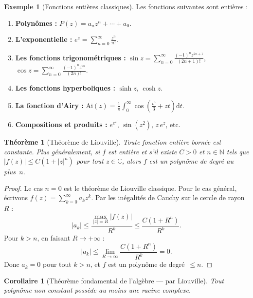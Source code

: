 \documentclass[12pt,a4paper,openany]{book}
\theoremstyle{definition}
\newtheorem{exemple}[definition]{Exemple}
\theoremstyle{plain}
\newtheorem{theoreme}[definition]{Théorème}
\newtheorem{corollaire}[definition]{Corollaire}
\theoremstyle{remark}
\newcommand{\C}{\mathbb{C}}
\newcommand{\N}{\mathbb{N}}
\newcommand{\dd}{\mathrm{d}}
\newcommand{\abs}[1]{\left|#1\right|}
\begin{document}
\begin{exemple}[Fonctions entières classiques]\label{ex:entieres-classiques}
Les fonctions suivantes sont entières :
\begin{enumerate}[label=(\roman*)]
  \item \textbf{Polynômes :} $P(z) = a_n z^n + \cdots + a_0$.
  \item \textbf{L'exponentielle :} $e^z = \sum_{n=0}^{\infty} \frac{z^n}{n!}$.
  \item \textbf{Les fonctions trigonométriques :}
    $\sin z = \sum_{n=0}^{\infty} \frac{(-1)^n z^{2n+1}}{(2n+1)!}$, \;
    $\cos z = \sum_{n=0}^{\infty} \frac{(-1)^n z^{2n}}{(2n)!}$.
  \item \textbf{Les fonctions hyperboliques :} $\sinh z$, $\cosh z$.
  \item \textbf{La fonction d'Airy :}
    $\mathrm{Ai}(z) = \frac{1}{\pi} \int_0^{\infty}
    \cos\!\left(\frac{t^3}{3} + zt\right) \dd t$.
  \item \textbf{Compositions et produits :} $e^{e^z}$, $\sin(z^2)$,
    $z \, e^{z}$, etc.
\end{enumerate}
\end{exemple}

\begin{theoreme}[Théorème de Liouville]\label{thm:liouville-revisit}
Toute fonction entière bornée est constante. Plus généralement, si $f$ est
entière et s'il existe $C > 0$ et $n \in \N$ tels que
$\abs{f(z)} \leq C(1 + \abs{z}^n)$ pour tout $z \in \C$, alors $f$ est un
polynôme de degré au plus~$n$.
\end{theoreme}

\begin{proof}
Le cas $n = 0$ est le théorème de Liouville classique. Pour le cas général,
écrivons $f(z) = \sum_{k=0}^{\infty} a_k z^k$. Par les inégalités de Cauchy
sur le cercle de rayon $R$ :
\[
  \abs{a_k} \leq \frac{\max_{\abs{z}=R} \abs{f(z)}}{R^k}
  \leq \frac{C(1 + R^n)}{R^k}.
\]
Pour $k > n$, en faisant $R \to +\infty$ :
\[
  \abs{a_k} \leq \lim_{R \to \infty} \frac{C(1 + R^n)}{R^k} = 0.
\]
Donc $a_k = 0$ pour tout $k > n$, et $f$ est un polynôme de degré~$\leq n$.
\end{proof}

\begin{corollaire}[Théorème fondamental de l'algèbre — par Liouville]\label{cor:fta-liouville}
Tout polynôme non constant possède au moins une racine complexe.
\end{corollaire}
\end{document}
